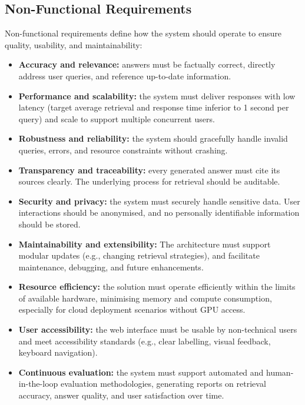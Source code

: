 \begin{spacing}{1.5}
\subsection{Non-Functional Requirements}
Non-functional requirements define how the system should operate to ensure quality, usability, and maintainability:
\begin{itemize}
    \item \textbf{Accuracy and relevance:} answers must be factually correct, directly address user queries, and reference up-to-date information.
    \item \textbf{Performance and scalability:} the system must deliver responses with low latency (target average retrieval and response time inferior to 1 second per query) and scale to support multiple concurrent users.
    \item \textbf{Robustness and reliability:} the system should gracefully handle invalid queries, errors, and resource constraints without crashing.
    \item \textbf{Transparency and traceability:} every generated answer must cite its sources clearly. The underlying process for retrieval should be auditable.
    \item \textbf{Security and privacy:} the system must securely handle sensitive data. User interactions should be anonymised, and no personally identifiable information should be stored.
    \item \textbf{Maintainability and extensibility:} The architecture must support modular updates (e.g., changing retrieval strategies), and facilitate maintenance, debugging, and future enhancements.
    \item \textbf{Resource efficiency:} the solution must operate efficiently within the limits of available hardware, minimising memory and compute consumption, especially for cloud deployment scenarios without GPU access.
    \item \textbf{User accessibility:} the web interface must be usable by non-technical users and meet accessibility standards (e.g., clear labelling, visual feedback, keyboard navigation).
    \item \textbf{Continuous evaluation:} the system must support automated and human-in-the-loop evaluation methodologies, generating reports on retrieval accuracy, answer quality, and user satisfaction over time.
\end{itemize}


\end{spacing}